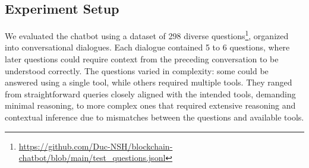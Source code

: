 \documentclass[runningheads]{llncs}
\begin{document}

\subsection{Experiment Setup}
We evaluated the chatbot using a dataset of 298 diverse questions\footnote{\url{https://github.com/Duc-NSH/blockchain-chatbot/blob/main/test_questions.jsonl}}, organized into conversational dialogues. Each dialogue contained 5 to 6 questions, where later questions could require context from the preceding conversation to be understood correctly. The questions varied in complexity: some could be answered using a single tool, while others required multiple tools. They ranged from straightforward queries closely aligned with the intended tools, demanding minimal reasoning, to more complex ones that required extensive reasoning and contextual inference due to mismatches between the questions and available tools.

\end{document}
